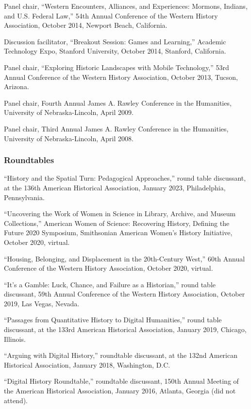 Panel chair, ``Western Encounters, Alliances, and Experiences: Mormons,
Indians, and U.S. Federal Law,'' 54th Annual Conference of the Western
History Association, October 2014, Newport Beach, California.

Discussion facilitator, ``Breakout Session: Games and Learning,''
Academic Technology Expo, Stanford University, October 2014, Stanford,
California.

Panel chair, ``Exploring Historic Landscapes with Mobile Technology,''
53rd Annual Conference of the Western History Association, October 2013,
Tucson, Arizona.

Panel chair, Fourth Annual James A. Rawley Conference in the Humanities,
University of Nebraska-Lincoln, April 2009.

Panel chair, Third Annual James A. Rawley Conference in the Humanities,
University of Nebraska-Lincoln, April 2008.

\hypertarget{roundtables}{%
\subsubsection{Roundtables}\label{roundtables}}

``History and the Spatial Turn: Pedagogical Approaches,'' round table
discussant, at the 136th American Historical Association, January 2023,
Philadelphia, Pennsylvania.

``Uncovering the Work of Women in Science in Library, Archive, and
Museum Collections,'' American Women of Science: Recovering History,
Defining the Future 2020 Symposium, Smithsonian American Women's History
Initiative, October 2020, virtual.

``Housing, Belonging, and Displacement in the 20th-Century West,'' 60th
Annual Conference of the Western History Association, October 2020,
virtual.

``It's a Gamble: Luck, Chance, and Failure as a Historian,'' round table
discussant, 59th Annual Conference of the Western History Association,
October 2019, Las Vegas, Nevada.

``Passages from Quantitative History to Digital Humanities,'' round
table discussant, at the 133rd American Historical Association, January
2019, Chicago, Illinois.

``Arguing with Digital History,'' roundtable discussant, at the 132nd
American Historical Association, January 2018, Washington, D.C.

``Digital History Roundtable,'' roundtable discussant, 150th Annual
Meeting of the American Historical Association, January 2016, Atlanta,
Georgia (did not attend).

